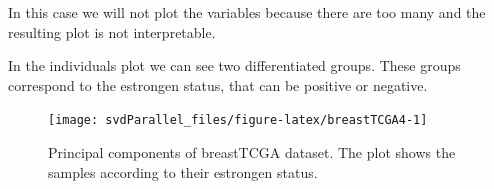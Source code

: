 \documentclass[]{article}
\newenvironment{Shaded}{\begin{snugshade}}{\end{snugshade}}
\newcommand{\KeywordTok}[1]{\textcolor[rgb]{0.13,0.29,0.53}{\textbf{#1}}}
\newcommand{\DataTypeTok}[1]{\textcolor[rgb]{0.13,0.29,0.53}{#1}}
\newcommand{\DecValTok}[1]{\textcolor[rgb]{0.00,0.00,0.81}{#1}}
\newcommand{\FloatTok}[1]{\textcolor[rgb]{0.00,0.00,0.81}{#1}}
\newcommand{\StringTok}[1]{\textcolor[rgb]{0.31,0.60,0.02}{#1}}
\newcommand{\OperatorTok}[1]{\textcolor[rgb]{0.81,0.36,0.00}{\textbf{#1}}}
\newcommand{\NormalTok}[1]{#1}
\begin{document}
In this case we will not plot the variables because there are too many
and the resulting plot is not interpretable.

In the individuals plot we can see two differentiated groups. These
groups correspond to the estrongen status, that can be positive or
negative.

\begin{Shaded}
\end{Shaded}

\begin{figure}

{\centering \texttt{[image: svdParallel\_files/figure-latex/breastTCGA4-1]} 

}

\caption{Principal components of breastTCGA dataset. The plot shows the samples according to their estrongen status.}\label{fig:breastTCGA4}
\end{figure}
\end{document}
